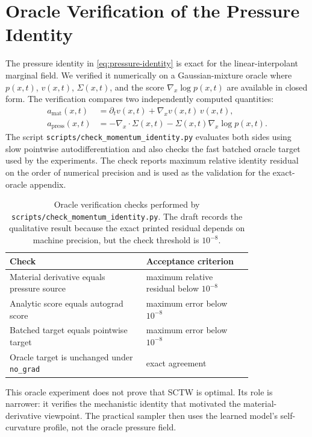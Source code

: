 \section{Oracle Verification of the Pressure Identity}
\label{sec:appendix-oracle}

The pressure identity in \cref{eq:pressure-identity} is exact for the linear-interpolant marginal
field. We verified it numerically on a Gaussian-mixture oracle where $p(x,t)$, $v(x,t)$,
$\Sigma(x,t)$, and the score $\nabla_x \log p(x,t)$ are available in closed form. The verification
compares two independently computed quantities:
\begin{align}
  a_{\mathrm{mat}}(x,t)
  &=
  \partial_t v(x,t) + \nabla_x v(x,t)\,v(x,t),
  \label{eq:oracle-material} \\
  a_{\mathrm{press}}(x,t)
  &=
  -\nabla_x \cdot \Sigma(x,t) - \Sigma(x,t)\nabla_x \log p(x,t).
  \label{eq:oracle-pressure}
\end{align}
The script \verb|scripts/check_momentum_identity.py| evaluates both sides using slow pointwise
autodifferentiation and also checks the fast batched oracle target used by the experiments. The
check reports maximum relative identity residual on the order of numerical precision and is used
as the validation for the exact-oracle appendix.

\begin{table}[h]
  \centering
  \caption{Oracle verification checks performed by \texttt{scripts/check\_momentum\_identity.py}.
  The draft records the qualitative result because the exact printed residual depends on machine
  precision, but the check threshold is $10^{-8}$.}
  \label{tab:oracle-verification}
  \begin{tabular}{p{0.45\linewidth}p{0.35\linewidth}}
    \toprule
    Check & Acceptance criterion \\
    \midrule
    Material derivative equals pressure source & maximum relative residual below $10^{-8}$ \\
    Analytic score equals autograd score & maximum error below $10^{-8}$ \\
    Batched target equals pointwise target & maximum error below $10^{-8}$ \\
    Oracle target is unchanged under \texttt{no\_grad} & exact agreement \\
    \bottomrule
  \end{tabular}
\end{table}

This oracle experiment does not prove that SCTW is optimal. Its role is narrower: it verifies the
mechanistic identity that motivated the material-derivative viewpoint. The practical sampler then
uses the learned model's self-curvature profile, not the oracle pressure field.
